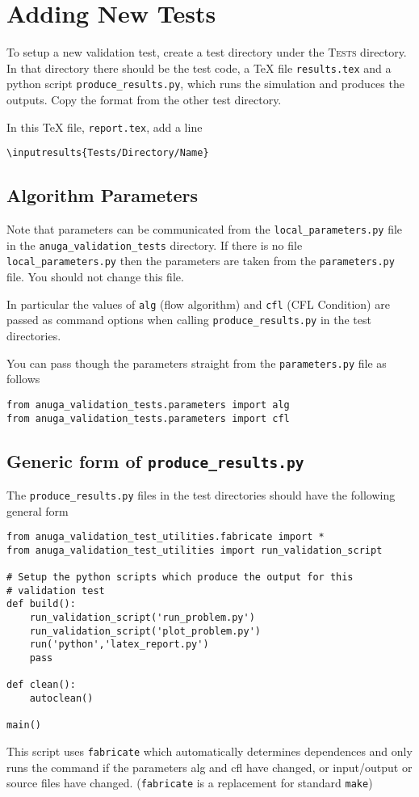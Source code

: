 \documentclass[11pt,a4paper]{report}
\begin{document}
\chapter{Adding New Tests}


To setup a new validation test, create a test directory under the
\textsc{Tests} directory. In that directory there should be the test code, a
\TeX{} file \texttt{results.tex} and a python script
\texttt{produce\_results.py}, which runs the simulation and produces the
outputs. Copy the format from the other test directory. 

In this \TeX{} file, \texttt{report.tex}, add a line
\begin{verbatim}
\inputresults{Tests/Directory/Name}
\end{verbatim}



\section{Algorithm Parameters}
Note that parameters can be communicated from the \verb|local_parameters.py|
file in the \verb|anuga_validation_tests| directory. If there is no file
\verb|local_parameters.py| then the parameters are taken from the
\verb|parameters.py| file. You should not change this file.

In particular the
values of \verb|alg| (flow algorithm) and \verb|cfl| (CFL Condition)
are passed as command options when calling \verb|produce_results.py| in the
test directories.

You can pass though the parameters straight from the \verb|parameters.py| file as follows
\begin{verbatim}
from anuga_validation_tests.parameters import alg
from anuga_validation_tests.parameters import cfl
\end{verbatim}

\section{Generic form of \texttt{produce\_results.py}}

The \texttt{produce\_results.py} files in the test directories should have the
following general form

\begin{verbatim}
from anuga_validation_test_utilities.fabricate import *
from anuga_validation_test_utilities import run_validation_script

# Setup the python scripts which produce the output for this
# validation test
def build():
    run_validation_script('run_problem.py')
    run_validation_script('plot_problem.py')
    run('python','latex_report.py')
    pass

def clean():
    autoclean()

main()
\end{verbatim}
This script uses \texttt{fabricate} which automatically determines dependences
and only runs the command if the parameters alg and cfl have changed,
or input/output or source files have changed. (\texttt{fabricate} is a replacement for
standard \texttt{make})





\end{document}
